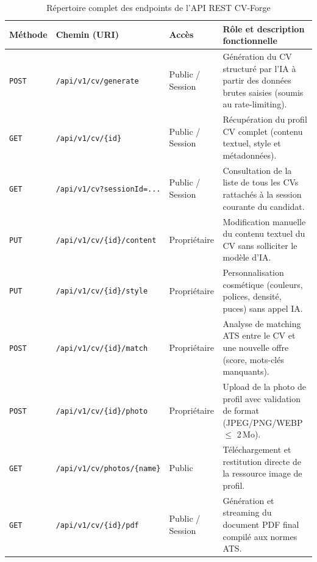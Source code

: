 \documentclass[11pt,a4paper]{article}
\begin{document}
\begin{table}[h!]
\centering
\small
\renewcommand{\arraystretch}{1.25}
\begin{tabularx}{\textwidth}{|l|l|l|X|}
\hline
\rowcolor{headergray}
\textbf{Méthode} & \textbf{Chemin (URI)} & \textbf{Accès} & \textbf{Rôle et description fonctionnelle} \\
\hline
\texttt{POST} & \texttt{/api/v1/cv/generate} & Public / Session & Génération du CV structuré par l'IA à partir des données brutes saisies (soumis au rate-limiting). \\
\hline
\texttt{GET} & \texttt{/api/v1/cv/\{id\}} & Public / Session & Récupération du profil CV complet (contenu textuel, style et métadonnées). \\
\hline
\texttt{GET} & \texttt{/api/v1/cv?sessionId=...} & Public / Session & Consultation de la liste de tous les CVs rattachés à la session courante du candidat. \\
\hline
\texttt{PUT} & \texttt{/api/v1/cv/\{id\}/content} & Propriétaire & Modification manuelle du contenu textuel du CV sans solliciter le modèle d'IA. \\
\hline
\texttt{PUT} & \texttt{/api/v1/cv/\{id\}/style} & Propriétaire & Personnalisation cosmétique (couleurs, polices, densité, puces) sans appel IA. \\
\hline
\texttt{POST} & \texttt{/api/v1/cv/\{id\}/match} & Propriétaire & Analyse de matching ATS entre le CV et une nouvelle offre (score, mots-clés manquants). \\
\hline
\texttt{POST} & \texttt{/api/v1/cv/\{id\}/photo} & Propriétaire & Upload de la photo de profil avec validation de format (JPEG/PNG/WEBP $\le$ 2\,Mo). \\
\hline
\texttt{GET} & \texttt{/api/v1/cv/photos/\{name\}} & Public & Téléchargement et restitution directe de la ressource image de profil. \\
\hline
\texttt{GET} & \texttt{/api/v1/cv/\{id\}/pdf} & Public / Session & Génération et streaming du document PDF final compilé aux normes ATS. \\
\hline
\end{tabularx}
\caption{Répertoire complet des endpoints de l'API REST CV-Forge}
\end{table}

\newpage

\end{document}
